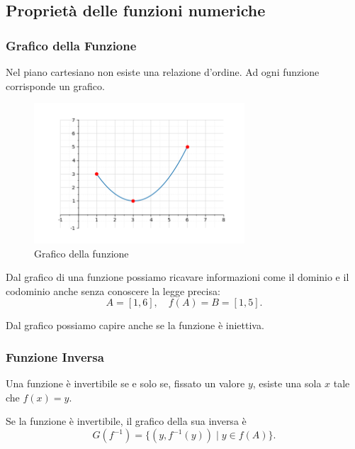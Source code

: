 \subsection{Proprietà delle funzioni numeriche}
\subsubsection{Grafico della Funzione}


Nel piano cartesiano non esiste una relazione d'ordine.
Ad ogni funzione corrisponde un grafico.

\begin{figure}[h]
    \centering
    \includegraphics[width=0.7\textwidth]{./img/grafico.png} %
    \caption{Grafico della funzione}
    \label{fig:grafico_della_funzione}
  \end{figure}
  
Dal grafico di una funzione possiamo ricavare informazioni come il dominio e il codominio anche senza conoscere la legge precisa:
\[
A = [1, 6], \quad f(A) = B = [1, 5].
\]

Dal grafico possiamo capire anche se la funzione è iniettiva.

\subsubsection{Funzione Inversa}

Una funzione è invertibile se e solo se, fissato un valore $y$, esiste una sola $x$ tale che $f(x) = y$.

Se la funzione è invertibile, il grafico della sua inversa è
\[
G(f^{-1}) = \{(y, f^{-1}(y)) \mid y \in f(A)\}.
\]

